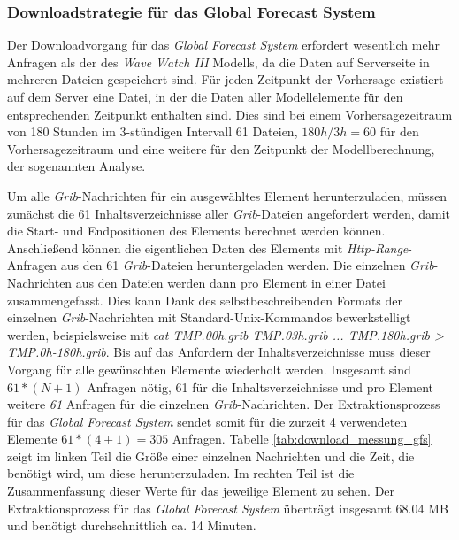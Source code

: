 \subsubsection{Downloadstrategie für das Global Forecast System}
Der Downloadvorgang für das \textit{Global Forecast System} erfordert
wesentlich mehr Anfragen als der des \textit{Wave Watch III} Modells,
da die Daten auf Serverseite in mehreren Dateien gespeichert sind. Für
jeden Zeitpunkt der Vorhersage existiert auf dem Server eine Datei, in
der die Daten aller Modellelemente für den entsprechenden Zeitpunkt
enthalten sind. Dies sind bei einem Vorhersagezeitraum von 180 Stunden
im 3-stündigen Intervall 61 Dateien, $180h / 3h = 60$ für den
Vorhersagezeitraum und eine weitere für den Zeitpunkt der
Modellberechnung, der sogenannten Analyse.

Um alle \textit{Grib}-Nachrichten für ein ausgewähltes Element
herunterzuladen, müssen zunächst die 61 Inhaltsverzeichnisse aller
\textit{Grib}-Dateien angefordert werden, damit die Start- und
Endpositionen des Elements berechnet werden können. Anschließend
können die eigentlichen Daten des Elements mit
\textit{Http-Range}-Anfragen aus den 61 \textit{Grib}-Dateien
heruntergeladen werden. Die einzelnen \textit{Grib}-Nachrichten aus
den Dateien werden dann pro Element in einer Datei
zusammengefasst. Dies kann Dank des selbstbeschreibenden Formats der
einzelnen \textit{Grib}-Nachrichten mit Standard-Unix-Kommandos
bewerkstelligt werden, beispielsweise mit \textit{cat TMP.00h.grib
  TMP.03h.grib ... TMP.180h.grib > TMP.0h-180h.grib}. Bis auf das
Anfordern der Inhaltsverzeichnisse muss dieser Vorgang für alle
gewünschten Elemente wiederholt werden. Insgesamt sind $ 61 * (N+1) $
Anfragen nötig, 61 für die Inhaltsverzeichnisse und pro Element
weitere \textit{61} Anfragen für die einzelnen
\textit{Grib}-Nachrichten. Der Extraktionsprozess für das
\textit{Global Forecast System} sendet somit für die zurzeit 4
verwendeten Elemente $ 61 * (4+1) = 305$ Anfragen. Tabelle
\ref{tab:download_messung_gfs} zeigt im linken Teil die Größe einer
einzelnen Nachrichten und die Zeit, die benötigt wird, um diese
herunterzuladen. Im rechten Teil ist die Zusammenfassung dieser Werte
für das jeweilige Element zu sehen. Der Extraktionsprozess für das
\textit{Global Forecast System} überträgt insgesamt 68.04 MB und
benötigt durchschnittlich ca. 14 Minuten.

